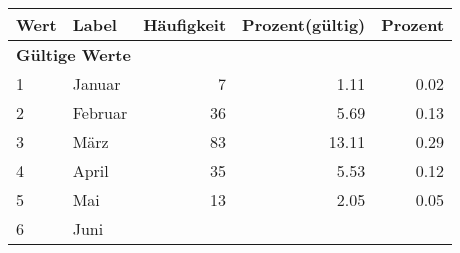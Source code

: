      \begin{longtable}{lXrrr}
     \toprule
     \textbf{Wert} & \textbf{Label} & \textbf{Häufigkeit} & \textbf{Prozent(gültig)} & \textbf{Prozent} \\
     \endhead
     \midrule
     \multicolumn{5}{l}{\textbf{Gültige Werte}}\\

     1 &
     \multicolumn{1}{X}{ Januar   } &


       \num{7} &
       \num[round-mode=places,round-precision=2]{1.11} &
         \num[round-mode=places,round-precision=2]{0.02} \\

     2 &
     \multicolumn{1}{X}{ Februar   } &


       \num{36} &
       \num[round-mode=places,round-precision=2]{5.69} &
         \num[round-mode=places,round-precision=2]{0.13} \\

     3 &
     \multicolumn{1}{X}{ März   } &


       \num{83} &
       \num[round-mode=places,round-precision=2]{13.11} &
         \num[round-mode=places,round-precision=2]{0.29} \\

     4 &
     \multicolumn{1}{X}{ April   } &


       \num{35} &
       \num[round-mode=places,round-precision=2]{5.53} &
         \num[round-mode=places,round-precision=2]{0.12} \\

     5 &
     \multicolumn{1}{X}{ Mai   } &


       \num{13} &
       \num[round-mode=places,round-precision=2]{2.05} &
         \num[round-mode=places,round-precision=2]{0.05} \\

     6 &
     \multicolumn{1}{X}{ Juni   } &



\end{longtable}
